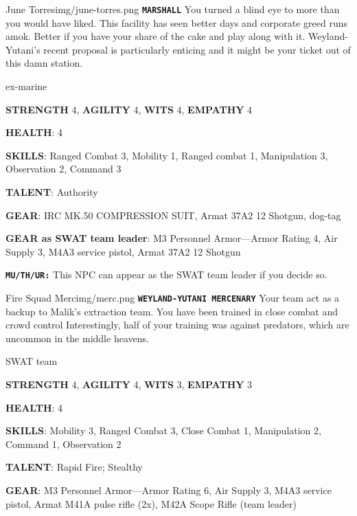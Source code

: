 \newsect

\medskip \medskip \medskip \medskip \medskip \medskip \medskip \medskip \medskip \medskip \medskip \medskip 
\medskip \medskip \medskip \medskip \medskip \medskip \medskip \medskip \medskip \medskip \medskip \medskip 


\begin{rpg-pcbox}{June Torres}{img/june-torres.png}
    \texttt{\textbf{MARSHALL}} You turned a blind eye to more than you would have liked. This facility has seen better days and corporate greed runs amok. Better if you have your share of the cake and play along with it. Weyland-Yutani's recent proposal is particularly enticing and it might be your ticket out of this damn station.
\end{rpg-pcbox}

\begin{rpg-commentbox}{}
    ex-marine

    \textbf{STRENGTH} 4, \textbf{AGILITY} 4, \textbf{WITS} 4, \textbf{EMPATHY} 4

    \textbf{HEALTH}: 4

    \textbf{SKILLS}: Ranged Combat 3, Mobility 1, Ranged combat 1, Manipulation 3, Observation 2, Command 3
    
    \textbf{TALENT}: Authority
    
    \textbf{GEAR}: IRC MK.50 COMPRESSION SUIT, Armat 37A2 12 Shotgun, dog-tag

    \textbf{GEAR as SWAT team leader}: M3 Personnel Armor---Armor Rating 4, Air Supply 3, M4A3 service pistol, Armat 37A2 12 Shotgun

\end{rpg-commentbox}

\begin{rpg-commentbox}{}
    \texttt{\textbf{MU/TH/UR:}} This NPC can appear as the SWAT team leader if you decide so. 
\end{rpg-commentbox}  

\newsect

\begin{rpg-pcbox}{Fire Squad Merc}{img/merc.png}
    \texttt{\textbf{WEYLAND-YUTANI MERCENARY}} Your team act as a backup to Malik's extraction team. You have been trained in close combat and crowd control Interestingly, half of your training was against predators, which are uncommon in the middle heavens.
\end{rpg-pcbox}

\begin{rpg-commentbox}{}
    SWAT team

    \textbf{STRENGTH} 4, \textbf{AGILITY} 4, \textbf{WITS} 3, \textbf{EMPATHY} 3

    \textbf{HEALTH}: 4

    \textbf{SKILLS}: Mobility 3, Ranged Combat 3, Close Combat 1, Manipulation 2, Command 1, Observation 2
    
    \textbf{TALENT}: Rapid Fire; Stealthy
    
    \textbf{GEAR}: M3 Personnel Armor---Armor Rating 6, Air Supply 3, M4A3 service pistol, Armat M41A pulse rifle (2x), M42A Scope Rifle (team leader)

\end{rpg-commentbox}


